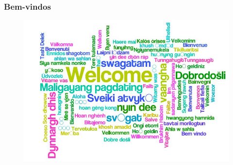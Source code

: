 \documentclass[aspectratio=169]{beamer}
\begin{document}

\begin{frame}\frametitle{Bem-vindos}
	\begin{figure}[h]
		\centering
		\includegraphics[height=0.7\paperheight]{pucrs-ec-poo-unidade_00-apresentacao_da_disciplina-laminas-welcome.jpg}
	\end{figure}
\end{frame}

\end{document}
